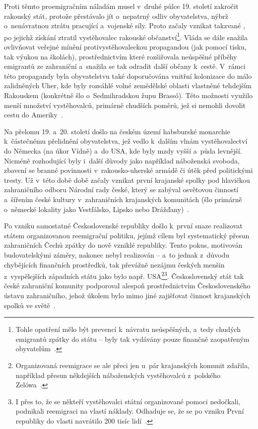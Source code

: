Proti těmto proemigračním náladám musel v~druhé půlce 19. století zakročit rakouský stát, protože přestávalo jít o~nepatrný odliv obyvatelstva, nýbrž o~nenávratnou ztrátu pracující a~vojenské síly. Proto začaly vznikat takzvané , po jejichž získání ztratil vystěhovalec rakouské občanství\footnote{Tohle opatření mělo být prevencí k~návratu neúspěšných, a~tedy chudých emigrantů zpátky do státu – byly tak vydávány pouze finančně zaopatřeným obyvatelům~\parencite{Vaculik2002}.}. Vláda se dále snažila ovlivňovat veřejné mínění protivystěhovaleckou propagandou (jak pomocí tisku, tak výukou na školách), prostřednictvím které rozšiřovala neúspěšné příběhy emigrantů ze zahraniční a~snažila se tak odradit další občany k~cestě. V~rámci této propagandy byla obyvatelstvu také doporučována vnitřní kolonizace do málo zalidněných Uher, kde byly rozsáhlé volné zemědělské oblasti vlastněné tehdejším Rakouskem (konkrétně šlo o~Sedmihradskou župu Brassó). Této možnosti využilo menší množství vystěhovalců, primárně chudších poměrů, jež si nemohli dovolit cestu do Ameriky~\parencite{Vaculik2009b}.

Na přelomu 19. a~20. století došlo na českém území habsburské monarchie k~částečnému přelidnění obyvatelstva, jež vedlo k~dalším vlnám vystěhovalectví do Německa (na úkor Vídně) a~do USA, kde byly mzdy vyšší a~půda levnější. Nicméně rozhodující byly i~další důvody jako například náboženská svoboda, zbavení se branné povinnosti v~rakousko-uherské armádě či útěk před politickými tresty. Už v~této době době začaly vznikat první krajanské spolky pod hlavičkou zahraničního odboru Národní rady české, který se zabýval osvětovou činností a~šířením české kultury v~zahraničních krajanských komunitách (šlo primárně o~německé lokality jako Vestfálsko, Lipsko nebo Drážďany)~\parencite{Vaculik2009b}.

Po vzniku samostatné Československé republiky došlo k~první snaze realizovat státem organizovanou reemigrační politiku, jejímž cílem byl systematický přesun zahraničních Čechů zpátky do nově vzniklé republiky. Tento pokus, motivován budovatelskými záměry, nakonec nebyl realizován -- a~to jednak z~důvodu chybějících finančních prostředků, tak převážně nezájmu českých menšin z~vyspělejších západních státu jako bylo např. USA\footnote{Organizovaná reemigrace se ale přeci jen u~pár krajanských komunit zdařila, například přesun někdejších náboženských vystěhovalců z~polského Zelówa~\parencite{Nespor2005}.}\footnote{I přes to, že se někteří vystěhovalci státní organizované pomoci nedočkali, podnikali reemigraci na vlastí náklady. Odhaduje se, že se po vzniku První republiky do vlasti navrátilo 200 tisíc lidí~\parencite{Vaculik2009b}.}. Československý stát tak české zahraniční komunity podporoval alespoň prostřednictvím Československého ústavu zahraničního, jehož úkolem bylo mimo jiné zajišťovat činnost krajanských spolků ve světě~\parencite{Nespor2005}.

